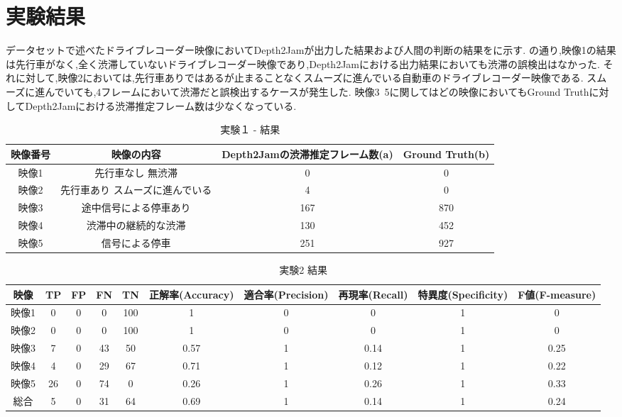 \section{実験結果}
データセットで述べたドライブレコーダー映像においてDepth2Jamが出力した結果および人間の判断の結果をに示す.
の通り,映像1の結果は先行車がなく,全く渋滞していないドライブレコーダー映像であり,Depth2Jamにおける出力結果においても渋滞の誤検出はなかった.
それに対して,映像2においては,先行車ありではあるが止まることなくスムーズに進んでいる自動車のドライブレコーダー映像である.
スムーズに進んでいても,4フレームにおいて渋滞だと誤検出するケースが発生した.
映像3~5に関してはどの映像においてもGround Truthに対してDepth2Jamにおける渋滞推定フレーム数は少なくなっている.
\begin{table}[htbp]
  \centering
  \begin{scriptsize}
  \begin{tabular}{cccc}
  \toprule
映像番号 & 映像の内容 & Depth2Jamの渋滞推定フレーム数(a) & Ground Truth(b)\\
  \midrule
映像1 & 先行車なし 無渋滞 & 0 & 0 \\
映像2 & 先行車あり スムーズに進んでいる & 4 & 0 \\
映像3 & 途中信号による停車あり & 167 & 870\\
映像4 & 渋滞中の継続的な渋滞 & 130 & 452\\
映像5 & 信号による停車 & 251 & 927 \\
\bottomrule
\end{tabular}
\end{scriptsize}
  \caption{実験１ - 結果}
  \label{tab:exp3_fig}
\end{table}


\begin{table}[htbp]
  \centering
  \begin{scriptsize}
  \begin{tabular}{cccccccccc}
  \toprule
映像 & TP & FP & FN & TN & 正解率(Accuracy) & 適合率(Precision) & 再現率(Recall) & 特異度(Specificity) & F値(F-measure) \\
  \midrule
映像1 & 0 & 0 & 0 & 100 & 1 & 0 & 0 & 1 & 0 \\
映像2 & 0 & 0 & 0 & 100 & 1 & 0 & 0 & 1 & 0 \\
映像3 & 7 & 0 & 43 & 50 & 0.57 & 1 & 0.14 & 1 & 0.25 \\
映像4 & 4 & 0 & 29 & 67 & 0.71 & 1 & 0.12 & 1 & 0.22 \\
映像5 & 26 & 0 & 74 & 0 & 0.26 & 1 & 0.26 & 1 & 0.33 \\
総合 & 5 & 0 & 31 & 64 & 0.69 & 1 & 0.14 & 1 & 0.24 \\
\bottomrule
\end{tabular}
\end{scriptsize}
  \caption{実験2 結果}
  \label{tab:mAP_fig}
\end{table}


